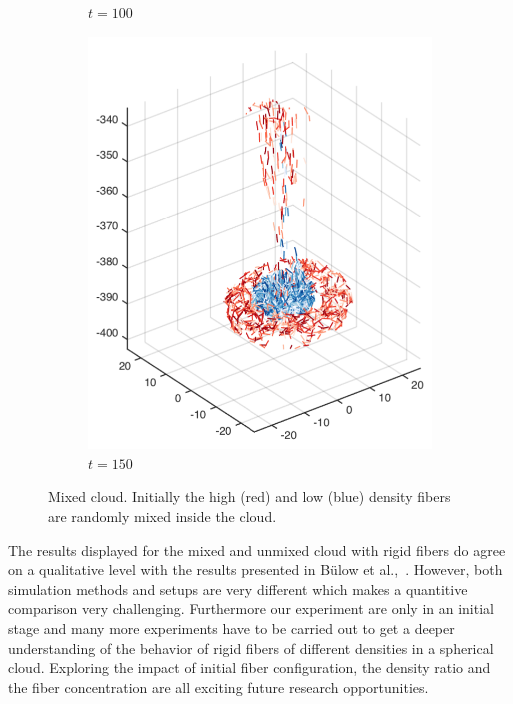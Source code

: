 \begin{figure}[!htbp]
\begin{subfigure}[h]{0.24\textwidth}
    \caption{$t=100$}\label{fig:mixing_random_c}
  \end{subfigure}
  \begin{subfigure}[h]{0.24\textwidth}
    \centering
    \includegraphics[width=\textwidth]{img/mixing/random_00150.pdf}
    \caption{$t=150$}\label{fig:mixing_random_d}
  \end{subfigure}
  \caption[Mixed cloud.]{Mixed cloud. Initially the high (red) and low (blue) density fibers are randomly mixed inside the cloud.}
  \label{fig:mixed_sphere}
\end{figure}

The results displayed for the mixed and unmixed cloud with rigid fibers do agree on a qualitative level with the results presented in Bülow et al.,~\cite{Bulow2015}. However, both simulation methods and setups are very different which makes a quantitive comparison very challenging. Furthermore our experiment are only in an initial stage and many more experiments have to be carried out to get a deeper understanding of the behavior of rigid fibers of different densities in a spherical cloud. Exploring the impact of initial fiber configuration, the density ratio and the fiber concentration are all exciting future research opportunities.
